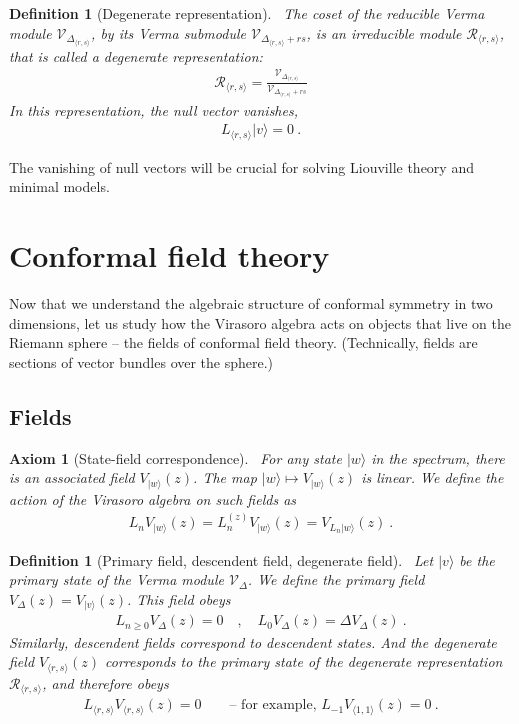 \documentclass[12pt, a4paper]{article}
\theoremstyle{break}
\newtheorem{hyp}[exo]{Axiom}
\newtheorem{defn}[exo]{Definition}
\begin{document}
\begin{defn}[Degenerate representation]
 ~\label{def:deg}
The coset of the reducible Verma module $\mathcal V_{\Delta_{\langle r,s\rangle}}$, by its Verma submodule $\mathcal V_{\Delta_{\langle r,s\rangle}+rs}$, is an irreducible module $\mathcal{R}_{\langle r,s\rangle}$, that is called a degenerate representation:
\begin{align}
 \mathcal{R}_{\langle r,s\rangle} = \frac{\mathcal V_{\Delta_{\langle r,s\rangle}}}{\mathcal V_{\Delta_{\langle r,s\rangle}+rs}}
\end{align}
In this representation, the null vector vanishes,
\begin{align}
 L_{\langle r,s\rangle}|v\rangle = 0\ .
\end{align}
\end{defn}
The vanishing of null vectors will be crucial for solving Liouville theory and minimal models.


\section{Conformal field theory}

Now that we understand the algebraic structure of conformal symmetry in two dimensions, let us study how the Virasoro algebra acts on objects that live on the Riemann sphere -- the fields of conformal field theory. (Technically, fields are sections of vector bundles over the sphere.)

\subsection{Fields}

\begin{hyp}[State-field correspondence]
 ~\label{hyp:sfc}
For any state $|w\rangle$ in the spectrum, there is an associated field $V_{|w\rangle}(z)$. The map $|w\rangle \mapsto V_{|w\rangle}(z)$ is linear. We define the action of the Virasoro algebra on such fields as 
\begin{align}
 L_n V_{|w\rangle}(z) =  L_n^{(z)} V_{|w\rangle}(z) = V_{L_n|w\rangle}(z)\ .
\end{align}
\end{hyp}

\begin{defn}[Primary field, descendent field, degenerate field]
~\label{def:pfdf}
Let $|v\rangle$ be the primary state of the Verma module $\mathcal V_\Delta$.
We define the primary field $V_\Delta(z)=V_{|v\rangle}(z)$. This field obeys
\begin{align}
 L_{n\geq 0} V_\Delta(z) = 0 \quad , \quad L_0 V_\Delta(z) = \Delta V_\Delta(z)\ .
\end{align}
Similarly, descendent fields correspond to descendent states. And the degenerate field $V_{\langle r,s\rangle}(z)$ corresponds to the primary state of the degenerate representation $\mathcal{R}_{\langle r,s\rangle}$, and therefore obeys 
\begin{align}
 L_{\langle r, s\rangle} V_{\langle r,s\rangle}(z) = 0\qquad \text{-- for example, \ } L_{-1}V_{\langle 1,1\rangle}(z) = 0\ .
\end{align}
\end{defn}
\end{document}
